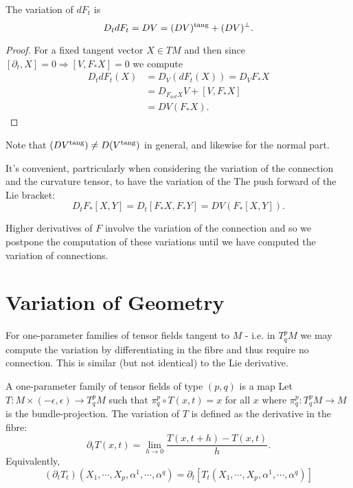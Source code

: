 \begin{prop}
The variation of \(dF_t\) is
\[
D_t dF_t = DV = (DV)^{\operatorname{tang}} + (DV)^{\perp}.
\]
\end{prop}

\begin{proof}
For a fixed tangent vector \(X \in TM\) and then since \([\partial_t, X] = 0 \Rightarrow [V, F_{\ast} X] = 0\) we compute
\[
\begin{split}
D_t dF_t (X) &= D_V (dF_t (X)) = D_V F_{\ast} X \\
&= D_{F_{ast} X} V + [V, F_{\ast} X] \\
&= DV (F_{\ast} X).
\end{split}
\]
\end{proof}

\begin{rem}
Note that \((DV^{\operatorname{tang}}) \ne D(V^{\operatorname{tang}})\) in general, and likewise for the normal part.
\end{rem}

\begin{rem}
It's convenient, partricularly when considering the variation of the connection and the curvature tensor, to have the variation of the The push forward of the Lie bracket:
\[
D_t F_{\ast} [X, Y] = D_t [F_{\ast} X, F_{\ast} Y] = DV(F_{\ast} [X, Y]).
\]
\end{rem}

Higher derivatives of \(F\) involve the variation of the connection and so we postpone the computation of these variations until we have computed the variation of connections.

\section{Variation of Geometry}

For one-parameter families of tensor fields tangent to \(M\) - i.e. in \(T^p_q M\) we may compute the variation by differentiating in the fibre and thus require no connection. This is similar (but not identical) to the Lie derivative.

\begin{defn}
A one-parameter family of tensor fields of type \((p, q)\) is a map
Let \(T : M \times (-\epsilon, \epsilon) \to T^p_q M\) such that \(\pi^p_q \circ T(x, t) = x\) for all \(x\) where \(\pi^p_q : T^p_q M \to M\) is the bundle-projection. The variation of \(T\) is defined as the derivative in the fibre:
\[
\partial_t T (x, t) = \lim_{h\to 0} \frac{T(x, t + h) - T(x, t)}{h}.
\]
Equivalently,
\[
(\partial_t T_t) (X_1, \cdots, X_p, \alpha^1, \cdots, \alpha^q) = \partial_t \left[T_t (X_1, \cdots, X_p, \alpha^1, \cdots, \alpha^q)\right]
\]
\end{defn}

